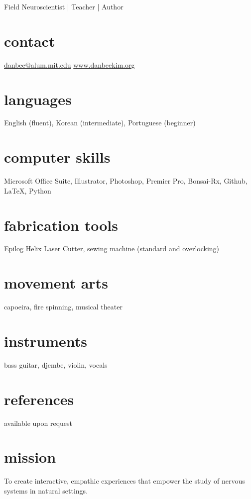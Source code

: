 \documentclass[]{friggeri-cv}
\begin{document}
       {Field Neuroscientist | Teacher | Author}


\begin{aside}
  \section{contact}
    \href{mailto:danbee@alum.mit.edu}{danbee@alum.mit.edu}
    \href{www.danbeekim.org}{www.danbeekim.org}
  \section{languages}
    English (fluent),
    Korean (intermediate),
    Portuguese (beginner)
  \section{computer skills}
    Microsoft Office Suite, 
	Illustrator, Photoshop, 
	Premier Pro, Bonsai-Rx, 
	Github, \LaTeX, Python
  \section{fabrication tools}
    Epilog Helix Laser Cutter, sewing machine (standard and overlocking)
  \section{movement arts}
    capoeira, fire spinning,
    musical theater
  \section{instruments}
    bass guitar, djembe,
    violin, vocals
  \section{references}
    available upon request        
\end{aside}

\section{mission}
To create interactive, empathic experiences that empower the study of nervous systems in natural settings. \\
\end{document}
